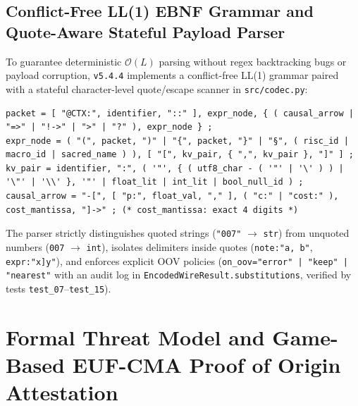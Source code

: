 \documentclass[9pt,a4paper]{extarticle}
\begin{document}
\subsection{Conflict-Free LL(1) EBNF Grammar and Quote-Aware Stateful Payload Parser}
To guarantee deterministic $\mathcal{O}(L)$ parsing without regex backtracking bugs or payload corruption, \texttt{v5.4.4} implements a conflict-free LL(1) grammar paired with a stateful character-level quote/escape scanner in \texttt{src/codec.py}:
\begin{lstlisting}
packet = [ "@CTX:", identifier, "::" ], expr_node, { ( causal_arrow | "=>" | "!->" | ">" | "?" ), expr_node } ;
expr_node = ( "(", packet, ")" | "{", packet, "}" | "§", ( risc_id | macro_id | sacred_name ) ), [ "[", kv_pair, { ",", kv_pair }, "]" ] ;
kv_pair = identifier, ":", ( '"', { ( utf8_char - ( '"' | '\' ) ) | '\"' | '\\' }, '"' | float_lit | int_lit | bool_null_id ) ;
causal_arrow = "-[", [ "p:", float_val, "," ], ( "c:" | "cost:" ), cost_mantissa, "]->" ; (* cost_mantissa: exact 4 digits *)
\end{lstlisting}
The parser strictly distinguishes quoted strings (\texttt{"007"} $\rightarrow$ \texttt{str}) from unquoted numbers (\texttt{007} $\rightarrow$ \texttt{int}), isolates delimiters inside quotes (\texttt{note:"a, b"}, \texttt{expr:"x]y"}), and enforces explicit OOV policies (\texttt{on\_oov="error" | "keep" | "nearest"} with an audit log in \texttt{EncodedWireResult.substitutions}, verified by tests \texttt{test\_07}--\texttt{test\_15}).

\section{Formal Threat Model and Game-Based EUF-CMA Proof of Origin Attestation}
\end{document}
